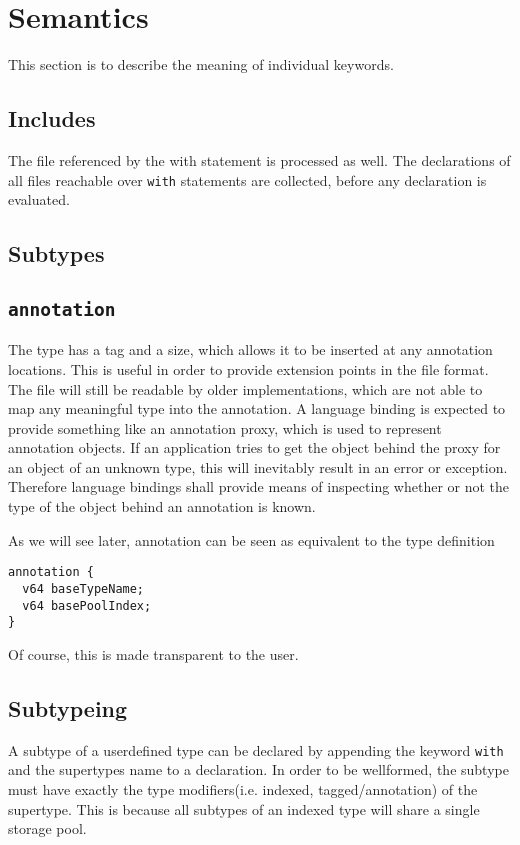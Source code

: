 \documentclass[a4paper,10pt]{article}
\begin{document}
\section{Semantics}

This section is to describe the meaning of individual keywords.

\subsection{Includes}
The file referenced by the with statement is processed as well. The declarations of all files reachable over \texttt{with} statements are collected, before any declaration is evaluated.

\subsection{Subtypes}

\subsection{\texttt{annotation}}
The type has a tag and a size, which allows it to be inserted at any annotation locations. This is useful in order to provide extension points in the file format. The file will still be readable by older implementations, which are not able to map any meaningful type into the annotation. A language binding is expected to provide something like an annotation proxy, which is used to represent annotation objects. If an application tries to get the object behind the proxy for an object of an unknown type, this will inevitably result in an error or exception. Therefore language bindings shall provide means of inspecting whether or not the type of the object behind an annotation is known.

As we will see later, annotation can be seen as equivalent to the type definition
\begin{verbatim}
annotation {
  v64 baseTypeName;
  v64 basePoolIndex;
}
\end{verbatim}
Of course, this is made transparent to the user.

\subsection{Subtypeing}
A subtype of a userdefined type can be declared by appending the keyword \texttt{with} and the supertypes name to a declaration. In order to be wellformed, the subtype must have exactly the type modifiers(i.e. indexed, tagged/annotation) of the supertype. This is because all subtypes of an indexed type will share a single storage pool.
\end{document}
